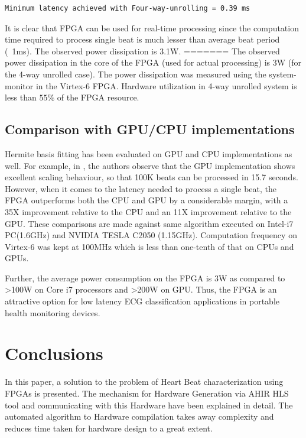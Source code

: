 \documentclass[runningheads]{llncs}
\begin{document}

\begin{verbatim}
Minimum latency achieved with Four-way-unrolling = 0.39 ms
\end{verbatim}
It is clear that FPGA can be used for real-time processing since the 
computation time required to process single beat is much lesser than
average beat period (~1ms). The observed power dissipation is 3.1W.  
=======
The observed power dissipation in the core of the 
FPGA (used for actual processing) is 3W (for the 4-way unrolled case).  The
power dissipation was measured using the system-monitor in the Virtex-6 FPGA.
Hardware utilization in 4-way unrolled system is less than $55\%$ 
of the FPGA resource.

\subsection{Comparison with GPU/CPU implementations}

Hermite basis fitting has been evaluated on GPU and CPU implementations
as well.  For example, in \cite{c:GPU}, the authors observe that
the GPU implementation shows excellent scaling behaviour, so that 
100K beats can be processed in 15.7 seconds.  However, when it comes
to the latency needed to process a single beat, the FPGA outperforms both 
the CPU and GPU by a considerable margin, with a 35X improvement relative to
the CPU and an 11X improvement relative to the GPU. 
These comparisons are made against same algorithm executed on Intel-i7 PC(1.6GHz) 
and NVIDIA TESLA C2050 (1.15GHz). Computation frequency on Virtex-6 was kept at 100MHz which is
less than one-tenth of that on CPUs and GPUs. 

Further, the average power consumption on the FPGA is 3W as compared to >100W on Core i7 processors and
>200W on GPU. Thus, the FPGA is an attractive option for low latency ECG classification
applications in portable health monitoring devices.

\section{Conclusions}\label{s:conclusions}

In this paper, a solution to the problem of Heart Beat characterization using FPGAs is presented.
The mechanism for Hardware Generation via AHIR HLS tool and communicating with this Hardware have
been explained in detail. The automated algorithm to Hardware compilation takes away complexity
and reduces time taken for hardware design to a great extent.
\end{document}
